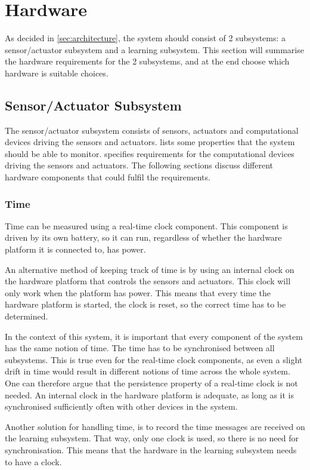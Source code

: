 \section{Hardware}
As decided in \cref{sec:architecture}, the system should consist of 2 subsystems: a sensor/actuator subsystem and a learning subsystem. This section will summarise the hardware requirements for the 2 subsystems, and at the end choose which hardware is suitable choices.

\subsection{Sensor/Actuator Subsystem}
The sensor/actuator subsystem consists of sensors, actuators and computational devices driving the sensors and actuators.  lists some properties that the system should be able to monitor.  specifies requirements for the computational devices driving the sensors and actuators. The following sections discuss different hardware components that could fulfil the requirements.

\subsubsection{Time}
Time can be measured using a real-time clock component. This component is driven by its own battery, so it can run, regardless of whether the hardware platform it is connected to, has power.

An alternative method of keeping track of time is by using an internal clock on the hardware platform that controls the sensors and actuators. This clock will only work when the platform has power. This means that every time the hardware platform is started, the clock is reset, so the correct time has to be determined.

In the context of this system, it is important that every component of the system has the same notion of time. The time has to be synchronised between all subsystems. This is true even for the real-time clock components, as even a slight drift in time would result in different notions of time across the whole system. One can therefore argue that the persistence property of a real-time clock is not needed. An internal clock in the hardware platform is adequate, as long as it is synchronised sufficiently often with other devices in the system.

Another solution for handling time, is to record the time messages are received on the learning subsystem. That way, only one clock is used, so there is no need for synchronisation. This means that the hardware in the learning subsystem needs to have a clock.

